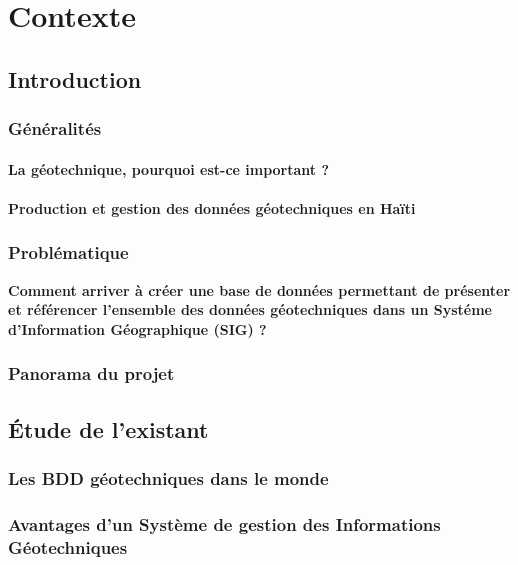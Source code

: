 \chapter{Contexte}
    \section{Introduction}
        
        \subsection{Généralités}
            \subsubsection{La géotechnique, pourquoi est-ce important ?}
            
            \subsubsection{Production et gestion des données géotechniques en Haïti}
                
        \subsection{Problématique}
        \textbf{Comment arriver à créer une base de données permettant de 
        présenter et référencer l'ensemble des données géotechniques dans un Systéme
        d’Information Géographique (SIG) ?}
       
        \subsection{Panorama du projet}
            
    \newpage
    \section{Étude de l'existant}
        \subsection{Les BDD géotechniques dans le monde}
            
        \subsection{Avantages d'un Système de gestion des Informations Géotechniques}
            
